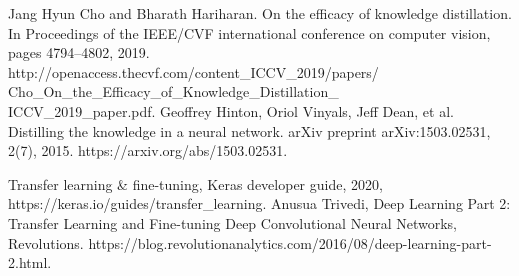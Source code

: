 \documentclass[conference]{IEEEtran}
\begin{document}
\begin{thebibliography}{00}


 Jang Hyun Cho and Bharath Hariharan. On the efficacy of knowledge distillation. In Proceedings of the IEEE/CVF international conference on computer vision, pages 4794–4802, 2019. http://openaccess.thecvf.com/content\_ICCV\_2019/papers/\\Cho\_On\_the\_Efficacy\_of\_Knowledge\_Distillation\_\\ICCV\_2019\_paper.pdf.
 Geoffrey Hinton, Oriol Vinyals, Jeff Dean, et al. Distilling the knowledge in a neural network. arXiv preprint arXiv:1503.02531, 2(7), 2015. https://arxiv.org/abs/1503.02531.


 Transfer learning \& fine-tuning, Keras developer guide, 2020, https://keras.io/guides/transfer\_learning.
 Anusua Trivedi, Deep Learning Part 2: Transfer Learning and Fine-tuning Deep Convolutional Neural Networks, Revolutions. https://blog.revolutionanalytics.com/2016/08/deep-learning-part-2.html.
\end{thebibliography}
\end{document}
